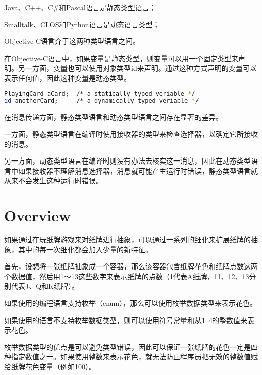 \begin{compactitem}
\item Java、C++、C\#和Pascal语言是静态类型语言；
\item Smalltalk、CLOS和Python语言是动态语言类型；
\item Objective-C语言介于这两种类型语言之间。
\end{compactitem}

在Objective-C语言中，如果变量是静态类型，则变量可以用一个固定类型来声明。另一方面，变量也可以使用对象类型id来声明。通过这种方式声明的变量可以表示任何值，因此这种变量是动态类型。

\begin{lstlisting}[language=bash]
PlayingCard aCard;	/* a statically typed veriable */
id anotherCard;		/* a dynamically typed veriable */
\end{lstlisting}

在消息传递方面，静态类型语言和动态类型语言之间存在显著的差异。

一方面，静态类型语言在编译时使用接收器的类型来检查选择器，以确定它所接收的消息。

另一方面，动态类型语言在编译时则没有办法去核实这一消息，因此在动态类型语言中如果接收器不理解消息选择器，消息就可能产生运行时错误，静态类型语言就从来不会发生这种运行时错误。

\section{Overview}

如果通过在玩纸牌游戏来对纸牌进行抽象，可以通过一系列的细化来扩展纸牌的抽象，其中的每一次细化都会加入少量的新特征。

首先，设想将一张纸牌抽象成一个容器，那么该容器包含纸牌花色和纸牌点数这两个数据值，然后用1～13这些数字来表示纸牌的点数（1代表A纸牌，11、12、13分别代表J、Q和K纸牌）。

\begin{compactitem}
\item 如果使用的编程语言支持枚举（enum），那么可以使用枚举数据类型来表示花色。
\item 如果使用的语言不支持枚举数据类型，则可以使用符号常量和从1~4的整数值来表示花色。
\end{compactitem}


枚举数据类型的优点是可以避免类型错误，因此可以保证一张纸牌的花色一定是四种指定数值之一。如果使用整数来表示花色，就无法防止程序员把无效的整数值赋给纸牌花色变量（例如100）。



